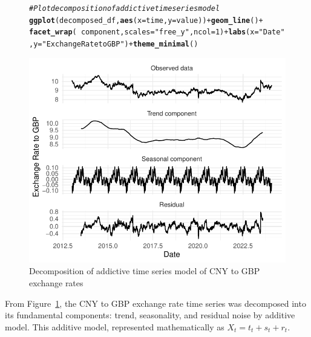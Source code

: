 \documentclass{article}\usepackage[]{graphicx}\usepackage[]{xcolor}
\makeatletter
\def\maxwidth{ %
  \ifdim\Gin@nat@width>\linewidth
    \linewidth
  \else
    \Gin@nat@width
  \fi
}
\newcommand{\hlnum}[1]{\textcolor[rgb]{0.686,0.059,0.569}{#1}}%
\newcommand{\hlstr}[1]{\textcolor[rgb]{0.192,0.494,0.8}{#1}}%
\newcommand{\hlcom}[1]{\textcolor[rgb]{0.678,0.584,0.686}{\textit{#1}}}%
\newcommand{\hlopt}[1]{\textcolor[rgb]{0,0,0}{#1}}%
\newcommand{\hlstd}[1]{\textcolor[rgb]{0.345,0.345,0.345}{#1}}%
\newcommand{\hlkwc}[1]{\textcolor[rgb]{0.333,0.667,0.333}{#1}}%
\newcommand{\hlkwd}[1]{\textcolor[rgb]{0.737,0.353,0.396}{\textbf{#1}}}%
\newenvironment{kframe}{%
 \def\at@end@of@kframe{}%
 \ifinner\ifhmode%
  \def\at@end@of@kframe{\end{minipage}}%
  \begin{minipage}{\columnwidth}%
 \fi\fi%
 \def\FrameCommand##1{\hskip\@totalleftmargin \hskip-\fboxsep
 \colorbox{shadecolor}{##1}\hskip-\fboxsep
     \hskip-\linewidth \hskip-\@totalleftmargin \hskip\columnwidth}%
 \MakeFramed {\advance\hsize-\width
   \@totalleftmargin\z@ \linewidth\hsize
   \@setminipage}}%
 {\par\unskip\endMakeFramed%
 \at@end@of@kframe}
\newenvironment{knitrout}{}{} %
\numberwithin{equation}{section}
\makeatother
\begin{document}
\begin{figure}[H]
\begin{knitrout}\scriptsize
{}\color{fgcolor}\begin{kframe}
\begin{alltt}
\hlcom{# Plot decomposition of addictive time series model}
\hlkwd{ggplot}\hlstd{(decomposed_df,} \hlkwd{aes}\hlstd{(}\hlkwc{x} \hlstd{= time,} \hlkwc{y} \hlstd{= value))} \hlopt{+} \hlkwd{geom_line}\hlstd{()} \hlopt{+}
  \hlkwd{facet_wrap}\hlstd{(}\hlopt{~}\hlstd{component,} \hlkwc{scales} \hlstd{=} \hlstr{"free_y"}\hlstd{,} \hlkwc{ncol} \hlstd{=} \hlnum{1}\hlstd{)} \hlopt{+} \hlkwd{labs}\hlstd{(}\hlkwc{x} \hlstd{=} \hlstr{"Date"}\hlstd{,}\hlkwc{y} \hlstd{=} \hlstr{"Exchange Rate to GBP"}\hlstd{)} \hlopt{+} \hlkwd{theme_minimal}\hlstd{()}
\end{alltt}
\end{kframe}

{\centering \includegraphics[width=\maxwidth]{figure/beamer-unnamed-chunk-4-1} 

}


\end{knitrout}
\centering
\caption{Decomposition of addictive time series model of CNY to GBP exchange rates}
\label{fig:decomposition of time series}
\end{figure}

\noindent
From Figure~\ref{fig:decomposition of time series}, the CNY to GBP exchange rate time series was decomposed into its fundamental components: trend, seasonality, and residual noise by additive model. This additive model, represented mathematically as $X_t = t_t + s_t + r_t$.\\
\end{document}
